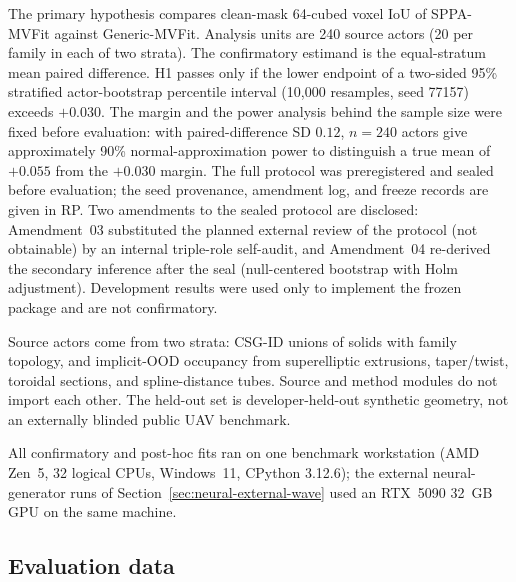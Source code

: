 \documentclass[11pt,a4paper]{article}
\begin{document}
The primary hypothesis compares clean-mask 64-cubed voxel IoU of SPPA-MVFit
against Generic-MVFit. Analysis units are 240 source actors (20 per family in
each of two strata). The confirmatory estimand is the equal-stratum mean paired
difference. H1 passes only if the lower endpoint of a two-sided 95\% stratified
actor-bootstrap percentile interval (10{,}000 resamples, seed 77157) exceeds
\(+0.030\). The margin and the power analysis behind the sample size were fixed
before evaluation: with paired-difference SD \(0.12\), \(n{=}240\) actors give
approximately 90\% normal-approximation power to distinguish a true mean of
\(+0.055\) from the \(+0.030\) margin. The full protocol was preregistered
and sealed before evaluation; the seed provenance, amendment log, and freeze
records are given in RP. Two amendments to the sealed
protocol are disclosed: Amendment~03 substituted the planned external review
of the protocol (not obtainable) by an internal triple-role self-audit, and
Amendment~04 re-derived the secondary inference after the seal (null-centered
bootstrap with Holm adjustment). Development results
were used only to implement the frozen package and are not confirmatory.

Source actors come from two strata: CSG-ID unions of solids with family
topology, and implicit-OOD occupancy from superelliptic extrusions,
taper/twist, toroidal sections, and spline-distance tubes. Source and method
modules do not import each other. The held-out set is developer-held-out
synthetic geometry, not an externally blinded public UAV benchmark.

All confirmatory and post-hoc fits ran on one benchmark workstation (AMD
Zen~5, 32 logical CPUs, Windows~11, CPython 3.12.6); the external
neural-generator runs of Section~\ref{sec:neural-external-wave} used an
RTX~5090 32~GB GPU on the same machine.

\subsection{Evaluation data}
\label{sec:evaluation-data}
\end{document}
